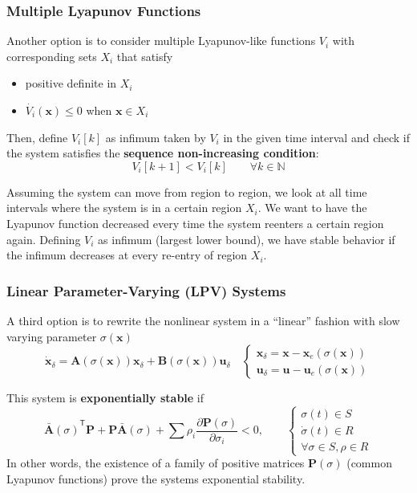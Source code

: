 \subsubsection{Multiple Lyapunov Functions}
Another option is to consider multiple Lyapunov-like functions $V_i$ with corresponding sets $X_i$ that satisfy
\begin{itemize}
    \item positive definite in $X_i$
    \item $\dot{V_i}(\mathbf{x})\leq 0$ when $\mathbf{x}\in X_i$
\end{itemize}
Then, define $V_i[k]$ as infimum taken by $V_i$ in the given time interval and check if the system satisfies the \textbf{sequence non-increasing condition}:
\noindent\begin{equation*}
    V_i[k+1] < V_i[k] \qquad \forall k \in \mathbb{N}
\end{equation*}

\newpar{}

Assuming the system can move from region to region, we look at all time intervals where the system is in a certain region $X_i$. We want to have the Lyapunov function decreased every time the system reenters a certain region again. Defining $V_i$ as infimum (largest lower bound), we have stable behavior if the infimum decreases at every re-entry of region $X_i$.

\subsubsection{Linear Parameter-Varying (LPV) Systems}
A third option is to rewrite the nonlinear system in a ``linear'' fashion with slow varying parameter $\sigma(\mathbf{x})$
\noindent\begin{equation*}
    \dot{\mathbf{x}}_\delta = \mathbf{A} (\sigma(\mathbf{x}))\mathbf{x}_\delta + \mathbf{B}(\sigma(\mathbf{x}))\mathbf{u}_\delta\quad
    \begin{cases}
        \mathbf{x}_\delta = \mathbf{x}-\mathbf{x}_e(\sigma(\mathbf{x})) \\
        \mathbf{u}_\delta = \mathbf{u}-\mathbf{u}_e(\sigma(\mathbf{x}))
    \end{cases}
\end{equation*}

\newpar{}

This system is \textbf{exponentially stable} if
\noindent\begin{equation*}
    {\bar{\mathbf{A}}(\sigma)}^{\mathsf{T}} \mathbf{P} + \mathbf{P}\bar{\mathbf{A}}(\sigma) + \sum \rho_i \frac{\partial \mathbf{P}(\sigma)}{\partial \sigma_i} < 0,\qquad
    \begin{cases}
        \sigma(t)\in S       \\
        \dot{\sigma}(t)\in R \\
        \forall \sigma\in S, \rho\in R
    \end{cases}
\end{equation*}
In other words, the existence of a family of positive matrices $\mathbf{P}(\sigma)$ (common Lyapunov functions) prove the systems exponential stability.

